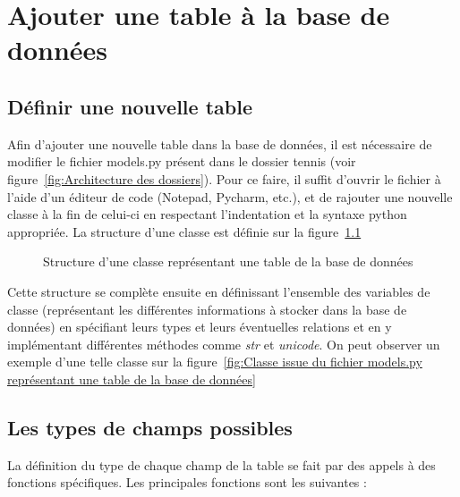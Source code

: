 \chapter{Ajouter une table à la base de données}
\label{ajouter une table}

\section{Définir une nouvelle table}

Afin d'ajouter une nouvelle table dans la base de données, il est nécessaire de modifier le fichier models.py présent dans le dossier tennis (voir figure~\ref{fig:Architecture des dossiers}). Pour ce faire, il suffit d'ouvrir le fichier à l'aide d'un éditeur de code (Notepad, Pycharm, etc.), et de rajouter une nouvelle classe à la fin de celui-ci en respectant l'indentation et la syntaxe python appropriée. La structure d'une classe est définie sur la figure~\ref{fig:Structure d'une classe représentant une table de la base de données}


\begin{figure}[!ht]
\centering

\caption{Structure d'une classe représentant une table de la base de données}
\label{fig:Structure d'une classe représentant une table de la base de données}
\end{figure}
\FloatBarrier

Cette structure se complète ensuite en définissant l'ensemble des variables de classe (représentant les différentes informations à stocker dans la base de données) en spécifiant leurs types et leurs éventuelles relations et en y implémentant différentes méthodes comme \textit{str} et \textit{unicode}. On peut observer un exemple d'une telle classe sur la figure~\ref{fig:Classe issue du fichier models.py représentant une table de la base de données}

\section{Les types de champs possibles}

La définition du type de chaque champ de la table se fait par des appels à des fonctions spécifiques. Les principales fonctions sont les suivantes :\\

